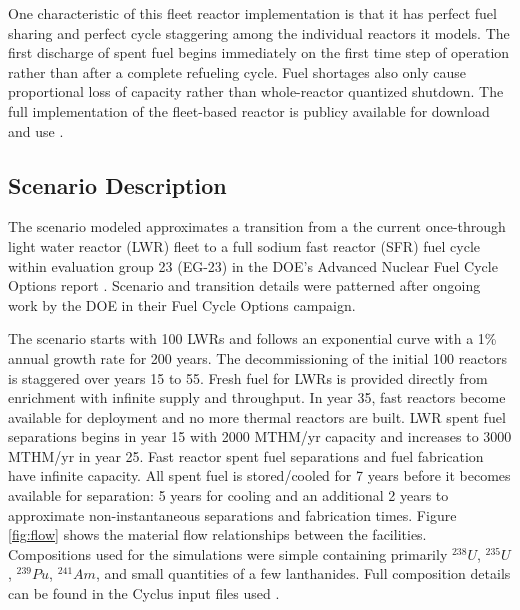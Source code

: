 \documentclass{style}
\begin{document}
One characteristic of this fleet reactor implementation is that it has perfect
fuel sharing and perfect cycle staggering among the individual reactors it
models.  The first discharge of spent fuel begins immediately on
the first time step of operation rather than after a complete refueling cycle.
Fuel shortages also only cause proportional loss of capacity rather than
whole-reactor quantized shutdown.  The full implementation of the fleet-based
reactor is publicy available for download and use \cite{Carlsen2015}.

\subsection{Scenario Description}

The scenario modeled approximates a transition from a the current once-through light water
reactor (LWR) fleet to a full sodium fast reactor (SFR) fuel cycle within evaluation group 23 (EG-23)
in the DOE's Advanced Nuclear Fuel Cycle Options report
\cite{wigeland_nuclear_2014}. Scenario and transition details were patterned
after ongoing work by the DOE in their Fuel Cycle Options campaign.

The scenario starts with 100 LWRs and follows an exponential curve with a 1\%
annual growth rate for 200 years.  The decommissioning of the initial 100
reactors is staggered over years 15 to 55.  Fresh fuel for LWRs is provided directly from enrichment with infinite supply and throughput. In year 35, fast reactors become available for
deployment and no more thermal reactors are built.  LWR spent fuel separations
begins in year 15 with 2000 MTHM/yr capacity and increases to 3000 MTHM/yr in
year 25.  Fast reactor spent fuel separations and fuel fabrication have
infinite capacity.  All spent fuel is stored/cooled for 7 years before it becomes
available for separation: 5 years for cooling and an additional 2 years to approximate non-instantaneous separations and fabrication times. Figure \ref{fig:flow} shows the material flow
relationships between the facilities.  Compositions used for the simulations
were simple containing primarily $^{238}U$, $^{235}U$, $^{239}Pu$, $^{241}Am$,
and small quantities of a few lanthanides.  Full composition details can be
found in the Cyclus input files used \cite{Carlsen2015}.
\end{document}
